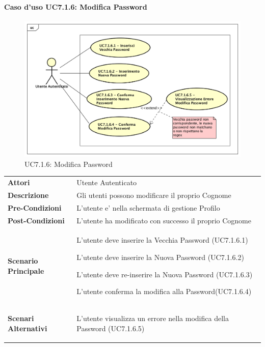 \paragraph{Caso d'uso UC7.1.6:  Modifica Password}
\label{UC7_1_6}
\begin{figure}[ht]
	\centering
	\includegraphics[scale=0.45]{UML/UC7_1_6.png}
	\caption{UC7.1.6:  Modifica Password}
\end{figure}
\FloatBarrier
\begin{tabular}{ l | p{11cm}}
	\hline
	\rowcolor{Gray}
	 \multicolumn{2}{c}{UC7.1.6 - Modifica Password} \\
	 \hline
		\textbf{Attori} & Utente Autenticato \\
	\textbf{Descrizione} & Gli utenti possono modificare il proprio Cognome\\
	\textbf{Pre-Condizioni} & L'utente e' nella schermata di gestione Profilo\\
	\textbf{Post-Condizioni} & L'utente ha modificato con successo il proprio Cognome \\
	\textbf{Scenario Principale} & 
	\begin{enumerate*}[label=(\arabic*.),itemjoin={\newline}]
		\item L'utente deve inserire la Vecchia Password (UC7.1.6.1)
		\item L'utente deve inserire la Nuova Password (UC7.1.6.2)
		\item L'utente deve re-inserire la Nuova Password (UC7.1.6.3)
		\item L'utente conferma la modifica alla Password(UC7.1.6.4)
	\end{enumerate*}\\
	\textbf{Scenari Alternativi} & 
	\begin{enumerate*}[label=(\arabic*.),itemjoin={\newline}]
		\item L'utente visualizza un errore nella modifica della Password (UC7.1.6.5)
	\end{enumerate*}\\
\end{tabular}
